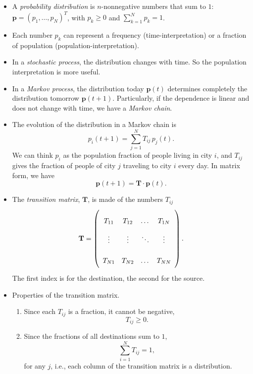 \documentclass{report}
\begin{document}
\begin{itemize}

  \item
  A \emph{probability distribution}
  is $n$-nonnegative numbers that sum to $1$:
  $\mathbf p = (p_1, \dots, p_N)^T$,
  with $p_k \ge 0$ and $\sum_{k = 1}^N p_k = 1$.

  \item
  Each number $p_k$ can represent a frequency (time-interpretation)
  or a fraction of population (population-interpretation).

  \item
  In a \emph{stochastic process},
  the distribution changes with time.
  So the population interpretation is more useful.

  \item
  In a \emph{Markov process},
  the distribution today $\mathbf p(t)$
  determines completely the distribution tomorrow $\mathbf p(t+1)$.
  Particularly, if the dependence is linear
  and does not change with time,
  we have a \emph{Markov chain}.

  \item
  The evolution of the distribution in a Markov chain is
  $$
  p_i(t+1) = \sum_{j = 1}^N T_{ij} \, p_j(t).
  $$
  We can think $p_i$ as the population fraction
  of people living in city $i$,
  and
  $T_{ij}$ gives the fraction of people of city $j$
  traveling to city $i$ every day.
  In matrix form, we have
  $$
  \mathbf p(t+1)
  =
  \mathbf T \cdot \mathbf p(t)
  .
  $$


  \item
  The \emph{transition matrix}, $\mathbf T$,
  is made of the numbers $T_{ij}$
  $$
  \def\arraystretch{2.4}
  \mathbf T
  =
  \left(
    \begin{array}{cccc}
      T_{11}    &   T_{12}    & \dots   & T_{1N} \\
      \vdots    &   \vdots    & \ddots  & \vdots \\
      T_{N1}    &   T_{N2}    & \dots   & T_{NN}
    \end{array}
  \right).
  $$
  The first index is for the destination,
  the second for the source.

  \item
  Properties of the transition matrix.
  \begin{enumerate}
    \item
    Since each $T_{ij}$ is a fraction,
    it cannot be negative,
    $$
    T_{ij} \ge 0.
    $$

    \item
    Since the fractions of all destinations sum to $1$,
    $$
    \sum_{i = 1}^N T_{ij} = 1,
    $$
    for any $j$,
    i.e., each column of the transition matrix
    is a distribution.


\end{enumerate}
\end{itemize}
\end{document}
